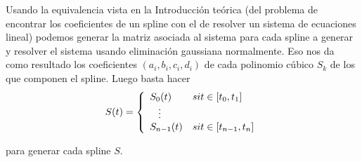 Usando la equivalencia vista en la Introducción teórica (del problema de encontrar los coeficientes de un spline con el de resolver un sistema de ecuaciones lineal) podemos generar la matriz asociada al sistema para cada spline a generar y resolver el sistema usando eliminación gaussiana normalmente. Eso nos da como resultado los coeficientes $(a_i,b_i,c_i,d_i)$ de cada polinomio cúbico $S_k$ de los que componen el spline. Luego basta hacer
$$
S(t) = 
\left\{
    \begin{array}{ll}
        S_0(t)  & \mbox{si } t \in [t_{0}, t_1] \\
        \hspace{0.3cm}\vdots \\     
        S_{n - 1}(t) & \mbox{si } t \in [t_{n - 1}, t_n]
    \end{array}
\right.
$$

para generar cada spline $S$.

